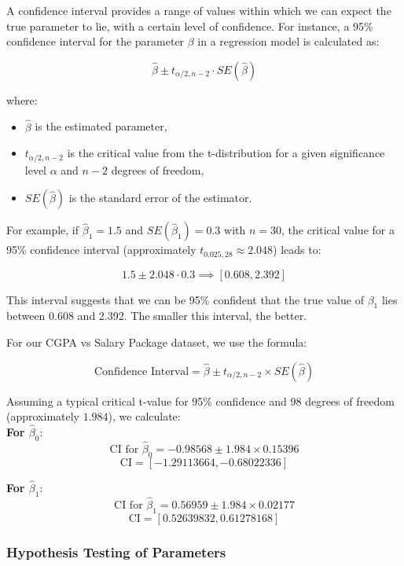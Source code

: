 \begin{definition}
    A confidence interval provides a range of values within which we can expect the true parameter to lie, with a certain level of confidence. For instance, a 95\% confidence interval for the parameter \(\beta\) in a regression model is calculated as:

\[
\hat{\beta} \pm t_{\alpha/2, n-2} \cdot SE(\hat{\beta})
\]

where:
\begin{itemize}
    \item \(\hat{\beta}\) is the estimated parameter,
    \item \(t_{\alpha/2, n-2}\) is the critical value from the t-distribution for a given significance level \(\alpha\) and \(n-2\) degrees of freedom,
    \item \(SE(\hat{\beta})\) is the standard error of the estimator.
\end{itemize}
\end{definition}

For example, if \(\hat{\beta}_1 = 1.5\) and \(SE(\hat{\beta}_1) = 0.3\) with \(n = 30\), the critical value for a 95\% confidence interval (approximately \(t_{0.025, 28} \approx 2.048\)) leads to:

\[
1.5 \pm 2.048 \cdot 0.3 \implies [0.608, 2.392]
\]

This interval suggests that we can be 95\% confident that the true value of \(\beta_1\) lies between 0.608 and 2.392. The smaller this interval, the better. 

\begin{example}
    For our CGPA vs Salary Package dataset, we use the formula:

    \[
    \text{Confidence Interval} = \hat{\beta} \pm t_{\alpha/2, n-2} \times SE(\hat{\beta})
    \]
    
    Assuming a typical critical t-value for 95\% confidence and 98 degrees of freedom (approximately \(1.984\)), we calculate:\\

    \textbf{For \(\hat{\beta}_0\)}:
\[
\text{CI for } \hat{\beta}_0 = -0.98568 \pm 1.984 \times 0.15396
\]
\[
\text{CI} = [-1.29113664, -0.68022336]
\]

\textbf{For \(\hat{\beta}_1\)}:
\[
\text{CI for } \hat{\beta}_1 = 0.56959 \pm 1.984 \times 0.02177
\]
\[
\text{CI} = [0.52639832, 0.61278168]
\]
\end{example}

\subsubsection{Hypothesis Testing of Parameters}

